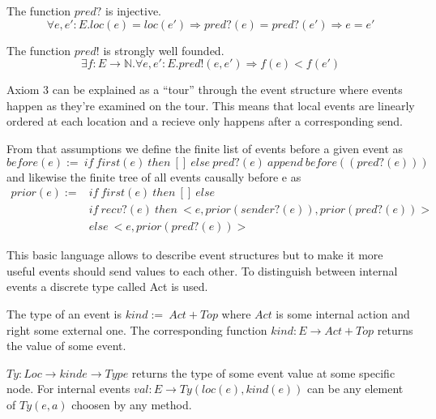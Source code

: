 \begin{axiom}
  The function $pred?$ is injective.
  \[\forall e,e':E.loc(e) = loc(e')\Rightarrow pred?(e) = pred?(e')\Rightarrow e=e'\]
\end{axiom}

\begin{axiom}
  The function $pred!$ is strongly well founded.
  \[\exists f:E\rightarrow \mathbb{N}.\forall e,e':E.pred!(e,e')\Rightarrow f(e)<f(e')\]
\end{axiom}

Axiom 3 can be explained as a ``tour'' through the event structure where
events happen as they're examined on the tour. This means that local
events are linearly ordered at each location and a recieve only happens
after a corresponding send.~\cite{bickford2005causal}

From that assumptions we define the finite list of events before a given event as
\[before(e):=\ if\ first(e)\ then\ []\ else\ pred?(e)\ append\ before((pred?(e)))\] 
and likewise the finite tree of all events causally before e as
\begin{align*}
  prior(e):= & if\ first(e)\ then\ []\ else\\
             & if\ recv?(e)\ then\ <e,prior(sender?(e)),prior(pred?(e))>\\
             & else\ <e,prior(pred?(e))>
\end{align*}

This basic language allows to describe event structures but to make
it more useful events should send values to each other. To distinguish
between internal events a discrete type called Act is used.~\cite{bickford2005causal}

\begin{defi}
  The type of an event is $kind :=\ Act + Top$ where $Act$ is some
  internal action and right some external one. The corresponding function
  $kind: E\rightarrow Act + Top$ returns the value of some event.
\end{defi}

\begin{defi}
  $Ty:Loc\rightarrow kinde\rightarrow Type$ returns the type of some event value at some specific
  node. For internal events $val:E\rightarrow Ty(loc(e),kind(e))$ can be any element of
  $Ty(e,a)$ choosen by any method.
\end{defi}

